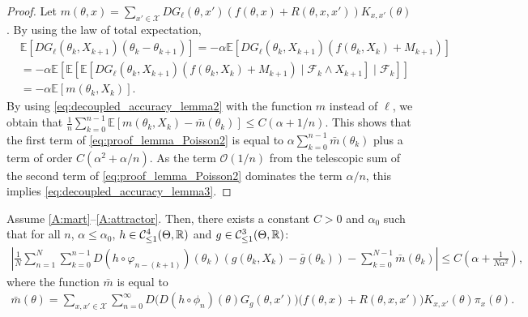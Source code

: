 \documentclass{article}
\newcommand{\R}{\mathbb{R}}
\newcommand{\calX}{\mathcal{X}}
\newcommand{\calF}{\mathcal{F}}
\newcommand\E{\mathbb{E}}
\newcommand\esp[1]{\E\left[#1\right]}
\newcommand\abs[1]{\left|#1\right|}
\newcommand{\p}[1]{\left(#1\right)}
\newcommand\bO[1]{\mathcal{O}(#1)}
\newcommand\cont[3][]{\mathcal{C}^{#2}_{\ifthenelse{\equal{#1}{all}}{}{\le1}}(#3,\R)}
\begin{document}
\begin{proof}
    Let $m(\theta,x)=\sum_{x'\in\calX} DG_\ell(\theta, x') (f(\theta,x) + R(\theta,x,x'))K_{x,x'}(\theta)$. By using the law of total expectation, 
    \begin{align*}
        &\esp{DG_\ell(\theta_k,X_{k+1})(\theta_k-\theta_{k+1})} = -\alpha \esp{DG_\ell(\theta_k,X_{k+1})(f(\theta_k,X_k)+M_{k+1})}\\
        &= -\alpha \esp{\esp{\esp{DG_\ell(\theta_k,X_{k+1})(f(\theta_k,X_k)+M_{k+1})\mid \calF_k\land X_{k+1}}\mid \calF_k}}\\
        &= -\alpha \esp{m(\theta_k,X_k)}.
    \end{align*}
    By using \eqref{eq:decoupled_accuracy_lemma2} with the function $m$ instead of $\ell$, we obtain that $\frac1n \sum_{k=0}^{n-1}\esp{m(\theta_k,X_k)-\bar{m}(\theta_k)} \le C(\alpha + 1/n)$. This shows that the first term of \eqref{eq:proof_lemma_Poisson2} is equal to $\alpha\sum_{k=0}^{n-1}\bar{m}(\theta_k)$ plus a term of order $C(\alpha^2+\alpha/n)$. As the term $\bO{1/n}$ from the telescopic sum of the second term of \eqref{eq:proof_lemma_Poisson2} dominates the term $\alpha/n$, this implies \eqref{eq:decoupled_accuracy_lemma3}.
\end{proof}

\begin{lemma}
    \label{lem:refined_barf}
    Assume \ref{A:mart}--\ref{A:attractor}. Then, there exists a constant $C>0$ and $\alpha_0$ such that for all $n$, $\alpha\le\alpha_0$, $h\in\cont{4}{\Theta}$ and $g\in\cont{3}{\Theta}$:
    \begin{align*}
        \abs{\frac1N\sum_{n=1}^N \sum_{k=0}^{n-1}D(h\circ\varphi_{n-(k+1)})(\theta_{k}) (g(\theta_k,X_k)-\bar{g}(\theta_k)) - \sum_{k=0}^{N-1} \bar{m}(\theta_k)} \le C\p{\alpha+\frac{1}{N\alpha^2}},
    \end{align*}
    where the function $\bar{m}$ is equal to 
    \begin{align*}
        \bar{m}(\theta) = \sum_{x,x'\in\calX} \sum_{n=0}^\infty D\bigl(D(h\circ\phi_n)(\theta) G_g(\theta, x')\bigr)\bigl(f(\theta,x)+R(\theta,x,x')\bigr)K_{x,x'}(\theta)\pi_x(\theta).
    \end{align*}
\end{lemma}
\end{document}
